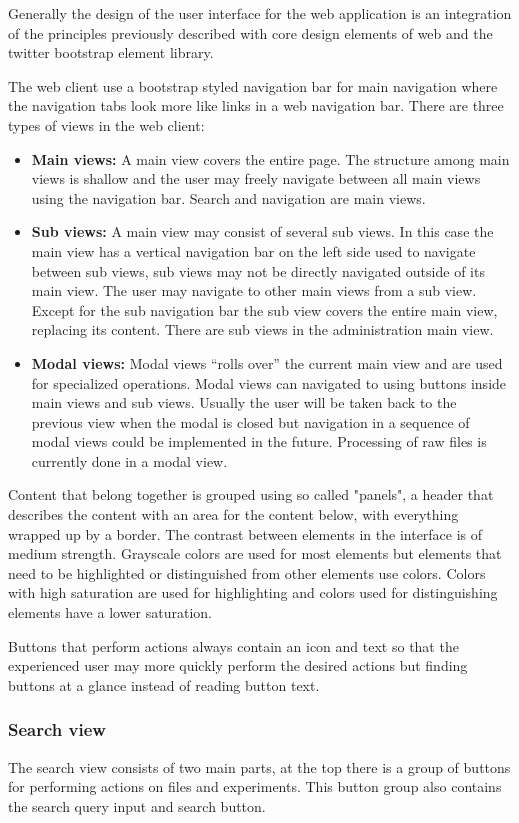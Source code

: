 Generally the design of the user interface for the web application is an integration of the principles previously described with core design elements of web and the twitter bootstrap element library.

The web client use a bootstrap styled navigation bar for main navigation where the navigation tabs look more like links in a web navigation bar. There are three types of views in the web client:
\begin{itemize}
	\item \textbf{Main views:} A main view covers the entire page. The structure among main views is shallow and the user may freely navigate between all main views using the navigation bar. Search and navigation are main views.
	\item \textbf{Sub views:} A main view may consist of several sub views. In this case the main view has a vertical navigation bar on the left side used to navigate between sub views, sub views may not be directly navigated outside of its main view. The user may navigate to other main views from a sub view. Except for the sub navigation bar the sub view covers the entire main view, replacing its content. There are sub views in the administration main view.
	\item \textbf{Modal views:} Modal views “rolls over” the current main view and are used for specialized operations. Modal views can navigated to using buttons inside main views and sub views. Usually the user will be taken back to the previous view when the modal is closed but navigation in a sequence of modal views could be implemented in the future. Processing of raw files is currently done in a modal view.
\end{itemize}
Content that belong together is grouped using so called "panels", a header that describes the content with an area for the content below, with everything wrapped up by a border.
The contrast between elements in the interface is of medium strength. Grayscale colors are used for most elements but elements that need to be highlighted or distinguished from other elements use colors. Colors with high saturation are used for highlighting and colors used for distinguishing elements have a lower saturation.

Buttons that perform actions always contain an icon and text so that the experienced user may more quickly perform the desired actions but finding buttons at a glance instead of reading button text.
\subsubsection{Search view}
The search view consists of two main parts, at the top there is a group of buttons for performing actions on files and experiments. This button group also contains the search query input and search button.

